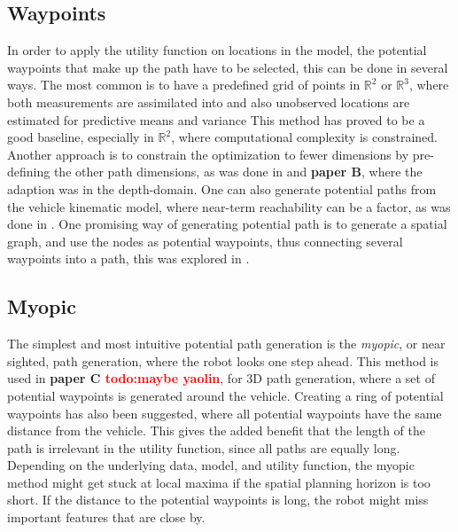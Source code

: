 \subsection{Waypoints}
In order to apply the utility function on locations in the model, the potential waypoints that make up the path have to be selected, this can be done in several ways. The most common is to have a predefined grid of points in $\mathbb{R}^2$ or $\mathbb{R}^3$, where both measurements are assimilated into and also unobserved locations are estimated for predictive means and variance \cite{kemna2018multi,berget2018adaptive,fossum2019adaptive}This method has proved to be a good baseline, especially in $\mathbb{R}^2$, where computational complexity is constrained. Another approach is to constrain the optimization to fewer dimensions by pre-defining the other path dimensions, as was done in \textcite{fossum2019toward} and \textbf{paper B}, where the adaption was in the depth-domain. One can also generate potential paths from the vehicle kinematic model, where near-term reachability can be a factor, as was done in \cite{stankiewicz2021adaptive}. One promising way of generating potential path is to generate a spatial graph, and use the nodes as potential waypoints, thus connecting several waypoints into a path, this was explored in \cite{fossum2021learning}. 

\subsection{Myopic}
The simplest and most intuitive potential path generation is the \textit{myopic}, or near sighted,  path generation, where the robot looks one step ahead. This method is used in \textbf{paper C \textcolor{red}{todo:maybe yaolin}}, for 3D path generation, where a set of potential waypoints is generated around the vehicle. Creating a ring of potential waypoints has also been suggested\cite{berget2018adaptive,fossum2021learning}, where all potential waypoints have the same distance from the vehicle. This gives the added benefit that the length of the path is irrelevant in the utility function, since all paths are equally long. Depending on the underlying data, model, and utility function, the myopic method might get stuck at local maxima  if the spatial planning horizon is too short. If the distance to the potential waypoints is long, the robot might miss important features that are close by. 

